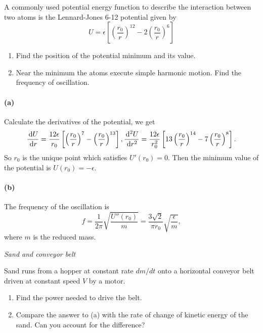 \documentclass{article}
\begin{document}
\begin{problem}
A commonly used potential energy function to describe the interaction between two atoms is the Lennard-Jones 6-12 potential given by
\[
  U=\epsilon\left[\left(\frac{r_0}{r}\right)^{12}-2\left(\frac{r_0}{r}\right)^6\right]
\]
\begin{enumerate}
  \item[a)] Find the position of the potential minimum and its value.
  \item[b)] Near the minimum the atoms execute simple harmonic motion. Find the frequency of oscillation.
\end{enumerate}
\end{problem}

\begin{solution}
	\paragraph{(a)} Calculate the derivatives of the potential, we get 
	\[ \frac{\,\mathrm{d} U}{\,\mathrm{d} r} = \frac{12\epsilon}{r_0} \left[ \left( \frac{r_0}{r} \right)^{7} - \left( \frac{r_0}{r} \right)^{13} \right], 
	\frac{\,\mathrm{d}^2 U}{\,\mathrm{d} r^2} = \frac{12\epsilon}{r_0^2} \left[ 13 \left( \frac{r_0}{r} \right)^{14} - 7 \left( \frac{r_0}{r} \right)^{8} \right]. \]
	So $r_0$ is the unique point which satisfies $U'(r_0) = 0$. Then the minimum value of the potential is $U(r_0) = -\epsilon$. 

	\paragraph{(b)} The frequency of the oscillation is
	\[ f = \frac{1}{2\pi} \sqrt{\frac{U''(r_0)}{m}} = \frac{3\sqrt{2}}{\pi r_0} \sqrt{\frac{\epsilon}{m}}, \]
	where $m$ is the reduced mass.
\end{solution}



\begin{problem}
\textit{Sand and conveyor belt}

Sand runs from a hopper at constant rate $dm/dt$ onto a horizontal conveyor belt driven at constant speed $V$ by a motor.
\begin{center}
  \resizebox{0.55\linewidth}{!}{}
\end{center}
\begin{enumerate}
  \item[(a)] Find the power needed to drive the belt.
  \item[(b)] Compare the answer to (a) with the rate of change of kinetic energy of the sand. Can you account for the difference?
\end{enumerate}
\end{problem}
\end{document}
